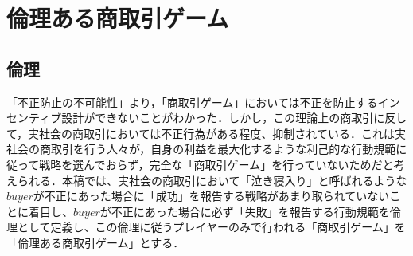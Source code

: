 
\section{倫理ある商取引ゲーム}

\subsection{倫理}
「不正防止の不可能性」より，「商取引ゲーム」においては不正を防止するインセンティブ設計ができないことがわかった．しかし，この理論上の商取引に反して，実社会の商取引においては不正行為がある程度、抑制されている．これは実社会の商取引を行う人々が，自身の利益を最大化するような利己的な行動規範に従って戦略を選んでおらず，完全な「商取引ゲーム」を行っていないためだと考えられる．本稿では、実社会の商取引において「泣き寝入り」と呼ばれるような$buyer$が不正にあった場合に「成功」を報告する戦略があまり取られていないことに着目し、$buyer$が不正にあった場合に必ず「失敗」を報告する行動規範を倫理として定義し、この倫理に従うプレイヤーのみで行われる「商取引ゲーム」を「倫理ある商取引ゲーム」とする．


